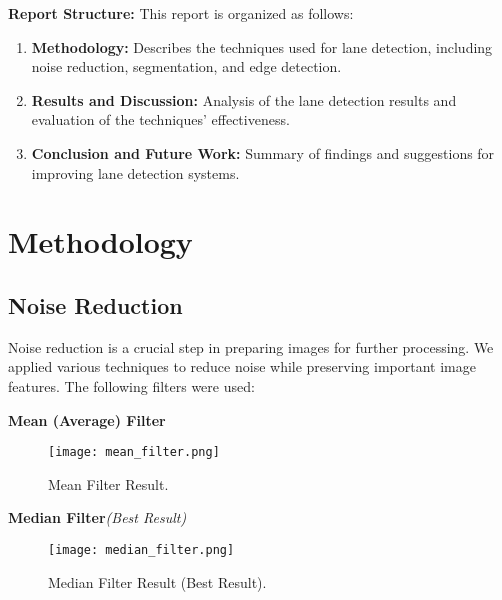 \documentclass[12pt,a4paper]{article}
\begin{document}
\vspace{0.5cm}
\noindent \textbf{Report Structure:} 
This report is organized as follows:
\begin{enumerate}
    \item \textbf{Methodology:} Describes the techniques used for lane detection, including noise reduction, segmentation, and edge detection.
    \item \textbf{Results and Discussion:} Analysis of the lane detection results and evaluation of the techniques' effectiveness.
    \item \textbf{Conclusion and Future Work:} Summary of findings and suggestions for improving lane detection systems.
\end{enumerate}




\newpage %
\section{Methodology}


\subsection{Noise Reduction}

Noise reduction is a crucial step in preparing images for further processing. We applied various techniques to reduce noise while preserving important image features. The following filters were used:

\vspace{1em} %
\textbf{Mean (Average) Filter}

\begin{figure}[h!]
    \centering
    \texttt{[image: mean\_filter.png]} %
    \caption{Mean Filter Result.}
    \label{fig:mean_filter}
\end{figure}

\vspace{1em} %
\textbf{Median Filter}\textit {(Best Result)}

\begin{figure}[h!]
    \centering
    \texttt{[image: median\_filter.png]} %
    \caption{Median Filter Result (Best Result).}
    \label{fig:median_filter}
\end{figure}
\end{document}
